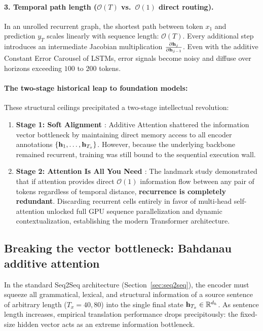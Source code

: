 \documentclass[../../main.tex]{subfiles}
\begin{document}
\paragraph{3. Temporal path length ($\mathcal{O}(T)$ vs.~$\mathcal{O}(1)$ direct routing).}
In an unrolled recurrent graph, the shortest path between token $x_1$ and prediction $y_T$ scales linearly with sequence length: $\mathcal{O}(T)$. Every additional step introduces an intermediate Jacobian multiplication $\frac{\partial \mathbf{h}_j}{\partial \mathbf{h}_{j-1}}$. Even with the additive Constant Error Carousel of LSTMs, error signals become noisy and diffuse over horizons exceeding $100$ to $200$ tokens.

\paragraph{The two-stage historical leap to foundation models:}
These structural ceilings precipitated a two-stage intellectual revolution:
\begin{enumerate}
    \item \textbf{Stage 1: Soft Alignment \cite{bahdanau2014}}: Additive Attention shattered the information vector bottleneck by maintaining direct memory access to all encoder annotations $\{\mathbf{h}_1, \dots, \mathbf{h}_{T_x}\}$. However, because the underlying backbone remained recurrent, training was still bound to the sequential execution wall.
    \item \textbf{Stage 2: Attention Is All You Need \cite{vaswani2017}}: The landmark study demonstrated that if attention provides direct $\mathcal{O}(1)$ information flow between any pair of tokens regardless of temporal distance, \textbf{recurrence is completely redundant}. Discarding recurrent cells entirely in favor of multi-head self-attention unlocked full GPU sequence parallelization and dynamic contextualization, establishing the modern Transformer architecture.
\end{enumerate}

\subsection{Breaking the vector bottleneck: Bahdanau additive attention}
\label{sec:bahdanau_attention}

In the standard Seq2Seq architecture (Section~\ref{sec:seq2seq}), the encoder must squeeze all grammatical, lexical, and structural information of a source sentence of arbitrary length ($T_x = 40, 80$) into the single final state $\mathbf{h}_{T_x} \in \mathbb{R}^{d_h}$. As sentence length increases, empirical translation performance drops precipitously: the fixed-size hidden vector acts as an extreme information bottleneck.
\end{document}
